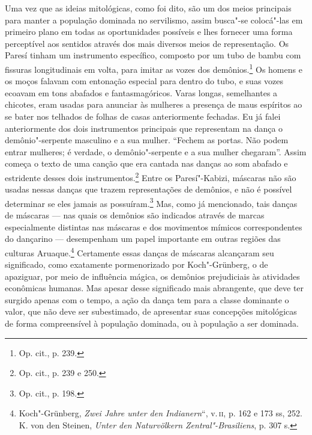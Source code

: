Uma vez que as ideias mitológicas, como foi dito, são um dos meios
principais para manter a população dominada no servilismo, assim
busca"-se colocá"-las em primeiro plano em todas as oportunidades
possíveis e lhes fornecer uma forma perceptível aos sentidos através dos
mais diversos meios de representação. Os Paresí tinham um instrumento
específico, composto por um tubo de bambu com fissuras longitudinais em
volta, para imitar as vozes dos demônios.\footnote{Op. cit., p. 239.} Os
homens e os moços falavam com entonação especial para dentro do tubo, e
suas vozes ecoavam em tons abafados e fantasmagóricos. Varas longas,
semelhantes a chicotes, eram usadas para anunciar às mulheres a presença
de maus espíritos ao se bater nos telhados de folhas de casas
anteriormente fechadas. Eu já falei anteriormente dos dois instrumentos
principais que representam na dança o demônio"-serpente masculino e a sua
mulher. ``Fechem as portas. Não podem entrar mulheres; é verdade, o
demônio"-serpente e a sua mulher chegaram''. Assim começa o texto de uma
canção que era cantada nas danças ao som abafado e estridente desses
dois instrumentos.\footnote{Op. cit., p. 239 e 250.} Entre os
Paresí"-Kabizi, máscaras não são usadas nessas danças que trazem
representações de demônios, e não é possível determinar se eles jamais
as possuíram.\footnote{Op. cit., p. 198.} Mas, como já mencionado, tais
danças de máscaras --- nas quais os demônios são indicados através de
marcas especialmente distintas nas máscaras e dos movimentos mímicos
correspondentes do dançarino --- desempenham um papel importante em
outras regiões das culturas Aruaque.\footnote{Koch"-Grünberg, \emph{Zwei
  Jahre unter den Indianern}``, v.\,\textsc{ii}, p. 162 e 173 ss, 252. K. von den
  Steinen, \emph{Unter den Naturvölkern Zentral"-Brasiliens}, p. 307 s.}
Certamente essas danças de máscaras alcançaram seu significado, como
exatamente pormenorizado por Koch"-Grünberg, o de apaziguar, por meio de
influência mágica, os demônios prejudiciais às atividades econômicas
humanas. Mas apesar desse significado mais abrangente, que deve ter
surgido apenas com o tempo, a ação da dança tem para a classe dominante
o valor, que não deve ser subestimado, de apresentar suas concepções
mitológicas de forma compreensível à população dominada, ou à
população a ser dominada.

